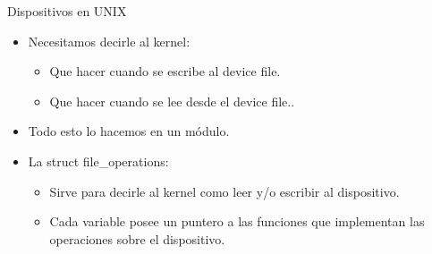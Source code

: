 \begin{frame}{Dispositivos en UNIX}
  \begin{itemize}
  \item Necesitamos decirle al kernel: 
  \begin{itemize}
    \item Que hacer cuando se escribe al device file.
    \item Que hacer cuando se lee desde el device file..
  \end{itemize} 
 \item Todo esto lo hacemos en un módulo.
 \item La struct \alert{file\_operations}: 
  \begin{itemize}
    \item Sirve para decirle al kernel como leer y/o escribir al dispositivo.
    \item Cada variable posee un puntero a las funciones que implementan las operaciones sobre el dispositivo.
  \end{itemize}   

  \end{itemize}
\end{frame}

